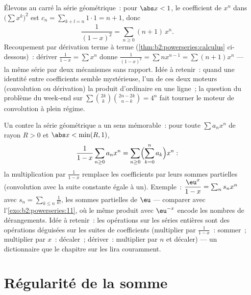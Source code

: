 \begin{example}\label{ex:b2:powerseries:cauchysquare}
Élevons au carré la série géométrique~: pour $\abs x < 1$, le
coefficient de $x^n$ dans $\bigl(\sum x^k\bigr)^2$ est $c_n =
\sum_{k+l=n} 1\cdot1 = n + 1$, donc
\[
\frac{1}{(1-x)^2} = \sum_{n\geq0}(n+1)\,x^n .
\]
Recoupement par dérivation terme à terme
(\cref{thm:b2:powerseries:calculus} ci-dessous)~: dériver
$\frac{1}{1-x} = \sum x^n$ donne $\frac{1}{(1-x)^2} = \sum
nx^{n-1} = \sum(n+1)x^n$ --- la même série par deux mécanismes
sans rapport. Idée à retenir~: quand une identité entre coefficients
semble mystérieuse, l'un de ces deux moteurs (convolution ou
dérivation) la produit d'ordinaire en une ligne~; la question du
problème du week-end sur $\sum\binom{2k}k\binom{2n-2k}{n-k} = 4^n$
fait tourner le moteur de convolution à plein régime.
\end{example}

\begin{example}\label{ex:b2:powerseries:partialsums}
Un  contre la série géométrique a un sens
mémorable~: pour toute $\sum a_nx^n$ de rayon $R > 0$ et $\abs x <
\min(R, 1)$,
\[
\frac{1}{1-x}\sum_{n\geq0}a_nx^n
= \sum_{n\geq0}\Bigl(\sum_{k=0}^{n}a_k\Bigr)x^n :
\]
la multiplication par $\frac{1}{1-x}$ remplace les coefficients par
leurs sommes partielles (convolution avec la suite constante égale
à un). Exemple~: $\dfrac{\eu^x}{1-x} = \sum_n s_n x^n$ avec $s_n =
\sum_{k\leq n}\frac{1}{k!}$, les sommes partielles de $\eu$ ---
comparer avec l'\cref{exo:b2:powerseries:11}, où le même produit
avec $\eu^{-x}$ encode les nombres de dérangements. Idée à
retenir~: les opérations sur les séries entières sont des
opérations déguisées sur les suites de coefficients (multiplier par
$\frac1{1-x}$~: sommer~; multiplier par $x$~: décaler~; dériver~:
multiplier par $n$ et décaler) --- un dictionnaire que le chapitre
sur les  lira couramment.
\end{example}

\section{Régularité de la somme}

